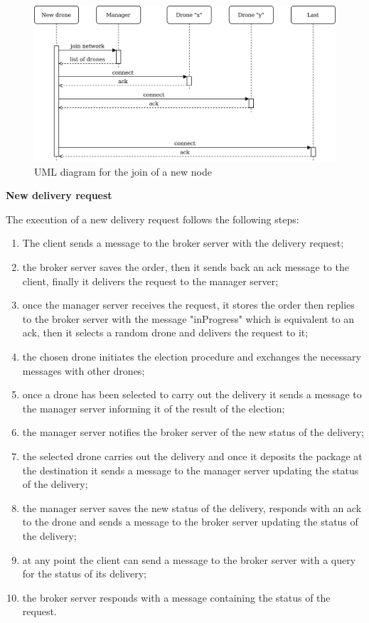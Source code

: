 \documentclass[a4paper, oneside]{memoir}
\begin{document}
\begin{figure}[h!]
	\centering
	\includegraphics[width=\linewidth]{New-drone}
	\caption{UML diagram for the join of a new node }
\end{figure}


\textbf{New delivery request}

The execution of a new delivery request follows the following steps:
\begin{enumerate}
\item The client sends a message to the broker server with the delivery request;
\item the broker server saves the order, then it sends back an ack message to the client, finally it delivers the request to the manager server;
\item once the manager server receives the request, it stores the order then replies to the broker server with the message "inProgress" which is equivalent to an ack, then it selects a random drone and delivers the request to it;
\item the chosen drone initiates the election procedure and exchanges the necessary messages with other drones;
\item once a drone has been selected to carry out the delivery it sends a message to the manager server informing it of the result of the election;
\item the manager server notifies the broker server of the new status of the delivery;
\item the selected drone carries out the delivery and once it deposits the package at the destination it sends a message to the manager server updating the status of the delivery;
\item the manager server saves the new status of the delivery, responds with an ack to the drone and sends a message to the broker server updating the status of the delivery;
\item at any point the client can send a message to the broker server with a query for the status of its delivery;
\item the broker server responds with a message containing the status of the request.
\end{enumerate}
\end{document}
